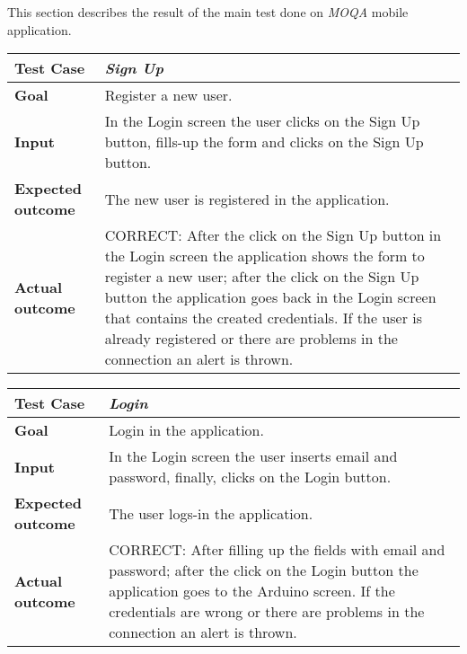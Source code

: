 This section describes the result of the main test done on \textit{MOQA} mobile application.

\bgroup
\def\arraystretch{1.2}

\begin{table}[H]
\begin{tabular}{| p{} | p{} |}
  \hline
  \textbf{Test Case} & \textit{Sign Up} \\ \hline
  \textbf{Goal} & Register a new user. \\ \hline
  \textbf{Input} & In the Login screen the user clicks on the Sign Up button, fills-up the form and clicks on the Sign Up button. \\ \hline
  \textbf{Expected outcome} & The new user is registered in the application. \\ \hline
  \textbf{Actual outcome} & CORRECT: After the click on the Sign Up button in the Login screen the application shows the form to register a new user; after the click on the Sign Up button the application goes back in the Login screen that contains the created credentials. If the user is already registered or there are problems in the connection an alert is thrown.\\ \hline
\end{tabular}
\end{table}

\begin{table}[H]
\begin{tabular}{| p{} | p{} |}
  \hline
  \textbf{Test Case} & \textit{Login} \\ \hline
  \textbf{Goal} & Login in the application. \\ \hline
  \textbf{Input} & In the Login screen the user inserts email and password, finally, clicks on the Login button. \\ \hline
  \textbf{Expected outcome} & The user logs-in the application. \\ \hline
  \textbf{Actual outcome} & CORRECT: After filling up the fields with email and password; after the click on the Login button the application goes to the Arduino screen. If the credentials are wrong or there are problems in the connection an alert is thrown.\\ \hline
\end{tabular}
\end{table}

